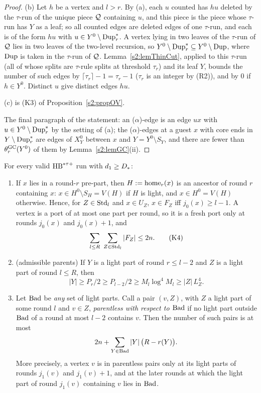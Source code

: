 \begin{proof}
(b) Let $h$ be a vertex and $l>r$. By (a), each $u$ counted has $hu$ deleted by
the $\tau$-run of the unique piece $\mathcal{Q}$ containing $u$, and this piece is
the piece whose $\tau$-run has $Y$ as a leaf; so all counted edges are deleted
edges of one $\tau$-run, and each is of the form $hu$ with $u\in
Y^0\setminus\mathrm{Dup}^{*}_r$. A vertex lying in two leaves of the $\tau$-run of
$\mathcal{Q}$ lies in two leaves of the two-level recursion, so
$Y^0\setminus\mathrm{Dup}^{*}_r\subseteq Y^0\setminus\mathrm{Dup}$, where $\mathrm{Dup}$ is taken in the
$\tau$-run of $\mathcal{Q}$. Lemma~\ref{s2:lemThinCut}, applied to this $\tau$-run
(all of whose splits are $\tau$-rule splits at threshold $\tau_r$) and its
leaf $Y$, bounds the number of such edges by $\lceil\tau_r\rceil-1=\tau_r-1$
($\tau_r$ is an integer by (R2)), and by $0$ if $h\in Y^0$. Distinct $u$ give
distinct edges $hu$.

(c) is (K3) of Proposition~\ref{s2:propOV}.

The final paragraph of the statement: an ($\alpha$)-edge is an edge $ux$ with
$u\in Y^0\setminus\mathrm{Dup}^{*}_r$ by the setting of (a); the ($\alpha$)-edges at a
guest $x$ with core ends in $Y\setminus\mathrm{Dup}^{*}_r$ are edges of $X^0_Y$ between
$x$ and $Y=Y^0\setminus S_Y$, and there are fewer than $\theta^{\mathrm{GC}}_r(Y^0)$ of them
by Lemma~\ref{s2:lemGC}(ii).
\end{proof}

\begin{proposition}\label{s2:propParentless}
For every valid $\mathrm{HB}^{*\tau{+}}$ run with $d_1\ge D_{*}$:
\begin{enumerate}
\item[(i)] If $x$ lies in a round-$r$ pre-part, then $H\mathrel{:=}\mathrm{home}_r(x)$ is an
ancestor of round $r$ containing $x$: $x\in H^0\setminus S_H=V(H)$ if $H$ is
light, and $x\in H^0=V(H)$ otherwise. Hence, for $Z\in\mathrm{Std}_l$ and $x\in U_Z$,
$x\in F_Z$ iff $j_0(x)\ge l-1$. A vertex is a port of at most one part per
round, so it is a fresh port only at rounds $j_0(x)$ and $j_0(x)+1$,
and
\begin{equation*}
\sum_{l\le R}\ \sum_{Z\in\Std_l}|F_Z|\le2n.\tag*{(K4)}
\end{equation*}
\item[(ii)] (admissible parents) If $Y$ is a light part of round $r\le l-2$ and
$Z$ is a light part of round $l\le R$, then
\[
|Y|\ge P_r/2\ge P_{l-2}/2\ge M_l\log^4M_l\ge|Z|\,L_Z^4.
\]
\item[(iii)] Let $\mathrm{Bad}$ be \emph{any} set of light parts. Call a pair $(v,Z)$,
with $Z$ a light part of some round $l$ and $v\in Z$, \emph{parentless with
respect to $\mathrm{Bad}$} if no light part outside $\mathrm{Bad}$ of a round at most $l-2$
contains $v$. Then the number of such pairs is at most
\[
2n+\sum_{Y\in\mathrm{Bad}}|Y|\,\bigl(R-r(Y)\bigr).
\]
More precisely, a vertex $v$ is in parentless pairs only at its light parts of
rounds $j_1(v)$ and $j_1(v)+1$, and at the later rounds at which the light part
of round $j_1(v)$ containing $v$ lies in $\mathrm{Bad}$.
\end{enumerate}
\deps{\ref{s2:propStructure}, \ref{s2:lemTower}, \ref{s2:lemCap}, \ref{s2:defAncestors}, \ref{s2:defHBtp}}
\end{proposition}

